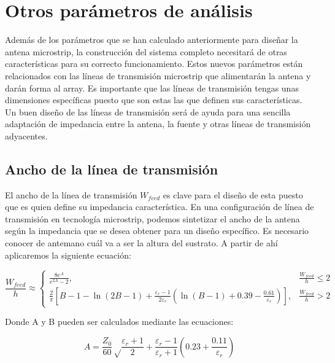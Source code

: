 \section{Otros parámetros de análisis}
\par Además de los parámetros que se han calculado anteriormente para diseñar la antena microstrip, la construcción del sistema completo necesitará de otras características para su correcto funcionamiento. Estos nuevos parámetros están relacionados con las líneas de transmisión microstrip que alimentarán la antena y darán forma al array. Es importante que las líneas de transmisión tengas unas dimensiones específicas puesto que son estas las que definen sus características. Un buen diseño de las líneas de transmisión será de ayuda para una sencilla adaptación de impedancia entre la antena, la fuente y otras líneas de transmisión adyacentes. \cite{Balanis2015}

\subsection{Ancho de la línea de transmisión}
\par El ancho de la línea de transmisión $W_{feed}$ es clave para el diseño de esta puesto que es quien define su impedancia característica. En una configuración de línea de transmisión en tecnología microstrip, podemos sintetizar el ancho de la antena según la impedancia que se desea obtener para un diseño específico. Es necesario conocer de antemano cuál va a ser la altura del sustrato. A partir de ahí aplicaremos la siguiente ecuación:

\begin{equation}
	\frac{W_{feed}}{h}\approx \begin{cases}
\frac{8e^{A}}{e^{2A}-2}, & \frac{W_{feed}}{h}\leq 2
\\ \frac{2}{\pi}\left [ B-1-\ln(2B-1)+\frac{\varepsilon _{r}-1}{2\varepsilon _{r}}\left ( \ln(B-1)+0.39-\frac{0.61}{\varepsilon _{r}} \right ) \right ], & \frac{W_{feed}}{h}>  2
\end{cases}
	\label{eq:wh}
\end{equation}

\par Donde A y B pueden ser calculados mediante las ecuaciones:

\begin{equation}
	A=\frac{Z_{0}}{60}\sqrt\frac{\varepsilon_{r}+1}{2}+\frac{\varepsilon_{r}-1}{\varepsilon_{r}+1}\left ( 0.23+\frac{0.11}{\varepsilon_{r}} \right ) 
	\label{eq:A}
\end{equation}

